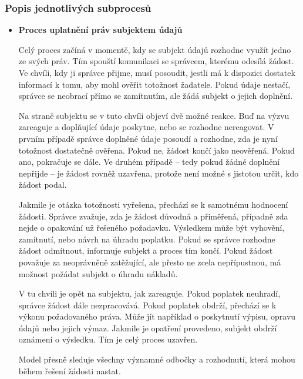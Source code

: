 
\subsubsection{Popis jednotlivých subprocesů}
\label{sec:bpmn-popis-subprocesu}

\begin{itemize}
  \item \textbf{Proces uplatnění práv subjektem údajů}
  
  Celý proces začíná v momentě, kdy se subjekt údajů rozhodne využít jedno ze svých práv. Tím spouští komunikaci se správcem, kterému odesílá žádost. Ve chvíli, kdy ji správce přijme, musí posoudit, jestli má k dispozici dostatek informací k tomu, aby mohl ověřit totožnost žadatele. Pokud údaje nestačí, správce se neobrací přímo se zamítnutím, ale žádá subjekt o jejich doplnění.

  Na straně subjektu se v tuto chvíli objeví dvě možné reakce. Buď na výzvu zareaguje a doplňující údaje poskytne, nebo se rozhodne nereagovat. V prvním případě správce doplněné údaje posoudí a rozhodne, zda je nyní totožnost dostatečně ověřena. Pokud ne, žádost končí jako neověřená. Pokud ano, pokračuje se dále. Ve druhém případě – tedy pokud žádné doplnění nepřijde – je žádost rovněž uzavřena, protože není možné s jistotou určit, kdo žádost podal.

  Jakmile je otázka totožnosti vyřešena, přechází se k samotnému hodnocení žádosti. Správce zvažuje, zda je žádost důvodná a přiměřená, případně zda nejde o opakování už řešeného požadavku. Výsledkem může být vyhovění, zamítnutí, nebo návrh na úhradu poplatku. Pokud se správce rozhodne žádost odmítnout, informuje subjekt a proces tím končí. Pokud žádost považuje za neoprávněně zatěžující, ale přesto ne zcela nepřípustnou, má možnost požádat subjekt o úhradu nákladů.

  V tu chvíli je opět na subjektu, jak zareaguje. Pokud poplatek neuhradí, správce žádost dále nezpracovává. Pokud poplatek obdrží, přechází se k výkonu požadovaného práva. Může jít například o poskytnutí výpisu, opravu údajů nebo jejich výmaz. Jakmile je opatření provedeno, subjekt obdrží oznámení o výsledku. Tím je celý proces uzavřen.

  Model přesně sleduje všechny významné odbočky a rozhodnutí, která mohou během řešení žádosti nastat. 


\end{itemize}
